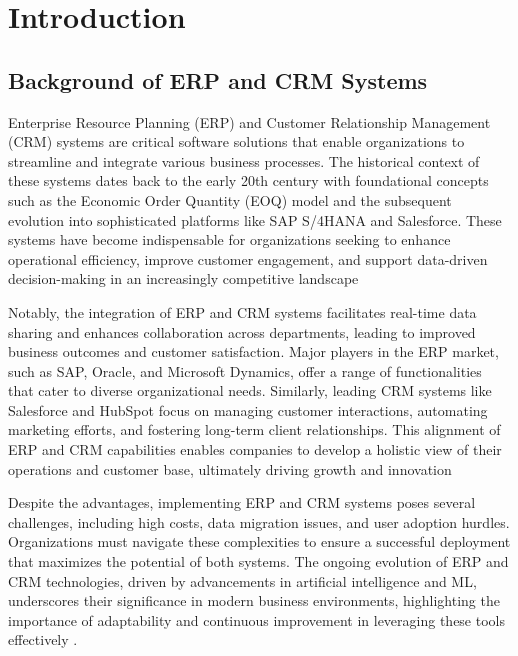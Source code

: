 



\chapter{Introduction}
\section{Background of ERP and CRM Systems} 

Enterprise Resource Planning (ERP) and Customer Relationship Management (CRM) systems are critical software solutions that enable organizations to streamline and integrate various business processes. The historical context of these systems dates back to the early 20th century with foundational concepts such as the Economic Order Quantity (EOQ) model and the subsequent evolution into sophisticated platforms like SAP S/4HANA and Salesforce. These systems have become indispensable for organizations seeking to enhance operational efficiency, improve customer engagement, and support data-driven decision-making in an increasingly competitive landscape \cite{oracle_erp,software_suggest_erp,softwareconnect} 

Notably, the integration of ERP and CRM systems facilitates real-time data sharing and enhances collaboration across departments, leading to improved business outcomes and customer satisfaction. Major players in the ERP market, such as SAP, Oracle, and Microsoft Dynamics, offer a range of functionalities that cater to diverse organizational needs. Similarly, leading CRM systems like Salesforce and HubSpot focus on managing customer interactions, automating marketing efforts, and fostering long-term client relationships. This alignment of ERP and CRM capabilities enables companies to develop a holistic view of their operations and customer base, ultimately driving growth and innovation \cite{forbes_crm, vtiger_crm, medium_crm}

Despite the advantages, implementing ERP and CRM systems poses several challenges, including high costs, data migration issues, and user adoption hurdles. Organizations must navigate these complexities to ensure a successful deployment that maximizes the potential of both systems. The ongoing evolution of ERP and CRM technologies, driven by advancements in artificial intelligence and ML, underscores their significance in modern business environments, highlighting the importance of adaptability and continuous improvement in leveraging these tools effectively \cite{sap_features,oracle_erp,sap_s4hana}.


